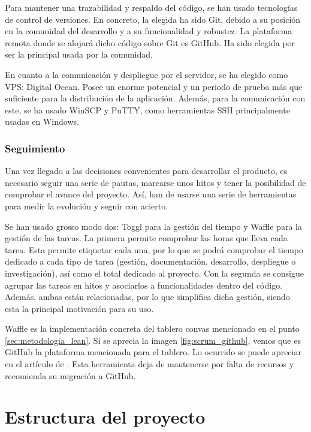 Para mantener una trazabilidad y respaldo del código, se han usado tecnologías de control de versiones. En concreto, la elegida ha sido Git, debido a su posición en la comunidad del desarrollo y a su funcionalidad y robustez. La plataforma remota donde se alojará dicho código sobre Git es GitHub. Ha sido elegida por ser la principal usada por la comunidad.

En cuanto a la comunicación y despliegue por el servidor, se ha elegido como VPS: Digital Ocean. Posee un enorme potencial y un periodo de prueba más que suficiente para la distribución de la aplicación. Además, para la comunicación con este, se ha usado WinSCP y PuTTY, como herramientas SSH principalmente usadas en Windows.

\subsubsection{Seguimiento}

Una vez llegado a las decisiones convenientes para desarrollar el producto, es necesario seguir una serie de pautas, marcarse unos hitos y tener la posibilidad de comprobar el avance del proyecto. Así, han de usarse una serie de herramientas para medir la evolución y seguir con acierto.

Se han usado grosso modo dos: Toggl para la gestión del tiempo y Waffle para la gestión de las tareas. La primera permite comprobar las horas que lleva cada tarea. Esta permite etiquetar cada una, por lo que se podrá comprobar el tiempo dedicado a cada tipo de tarea (gestión, documentación, desarrollo, despliegue o investigación), así como el total dedicado al proyecto. Con la segunda se consigue agrupar las tareas en hitos y asociarlos a funcionalidades dentro del código. Además, ambas están relacionadas, por lo que simplifica dicha gestión, siendo esta la principal motivación para su uso.

Waffle es la implementación concreta del tablero convas mencionado en el punto \ref{sec:metodologia_lean}. Si se aprecia la imagen \ref{fig:scrum_github}, vemos que es GitHub la plataforma mencionada para el tablero. Lo ocurrido se puede apreciar en el artículo de . Esta herramienta deja de mantenerse por falta de recursos y recomienda su migración a GitHub.

\section{Estructura del proyecto}\label{sec:estructra_proyecto}

